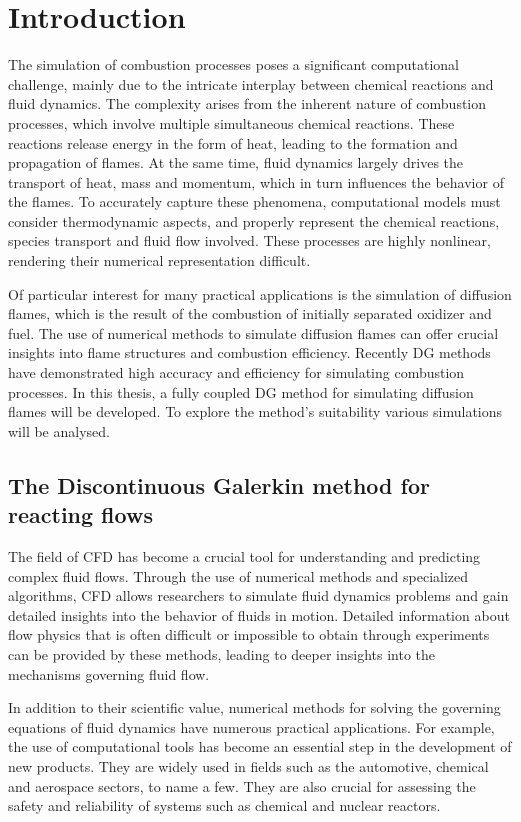 \chapter{Introduction}	\label{ch:introduction}
The simulation of combustion processes poses a significant computational challenge, mainly due to the intricate interplay between chemical reactions and fluid dynamics. The complexity arises from the inherent nature of combustion processes, which involve multiple simultaneous chemical reactions. These reactions release energy in the form of heat, leading to the formation and propagation of flames. At the same time, fluid dynamics largely drives the transport of heat, mass and momentum, which in turn influences the behavior of the flames.  To accurately capture these phenomena, computational models must consider thermodynamic aspects, and properly represent the chemical reactions, species transport and fluid flow involved. These processes are highly nonlinear, rendering their numerical representation difficult.

Of particular interest for many practical applications is the simulation of diffusion flames, which is the result of the combustion of initially separated oxidizer and fuel. The use of numerical methods to simulate diffusion flames can offer crucial insights into flame structures and combustion efficiency. Recently \Gls{DG} methods have demonstrated high accuracy and efficiency for simulating combustion processes. In this thesis, a fully coupled \gls{DG} method for simulating diffusion flames will be developed. To explore the method's suitability various simulations will be analysed.

\section{The Discontinuous Galerkin method for reacting flows}
The field of \Gls{CFD} has become a crucial tool for understanding and predicting complex fluid flows. Through the use of numerical methods and specialized algorithms, CFD allows researchers to simulate fluid dynamics problems and gain detailed insights into the behavior of fluids in motion. Detailed information about flow physics that is often difficult or impossible to obtain through experiments can be provided by these methods, leading to deeper insights into the mechanisms governing fluid flow. 

In addition to their scientific value, numerical methods for solving the governing equations of fluid dynamics have numerous practical applications. For example, the use of computational tools has become an essential step in the development of new products. They are widely used in fields such as the automotive, chemical and aerospace sectors, to name a few. They are also crucial for assessing the safety and reliability of systems such as chemical and nuclear reactors.

